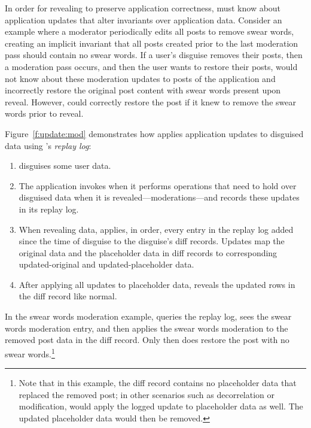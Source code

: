 In order for revealing to preserve application correctness, \sys must know about
application updates that alter invariants over application data.
%
Consider an example where a moderator periodically edits all posts to remove
swear words, creating an implicit invariant that all posts created prior to the
last moderation pass should contain no swear words.
%
If a user's disguise removes their posts, then a moderation pass occurs, and
then the user wants to restore their posts, \sys would not know about these
moderation updates to posts of the application and incorrectly restore the
original post content with swear words present upon reveal.
%
However, \sys could correctly restore the post if it knew to remove the swear
words prior to reveal.
%
%
%

%
Figure~\ref{f:update:mod} demonstrates how \sys applies application updates to
disguised data using \sys's \emph{replay log}:
\begin{enumerate}[nosep]
    \item[(1)] \sys disguises some user data.
    \item[(2)] The application invokes \sys when it
performs operations that need to hold over disguised data when it is
revealed---\eg moderations---and \sys records these updates in its replay log.
    \item[(3)] When revealing data, \sys applies, in order, every entry in the replay log
added since the time of disguise to the disguise's diff records.
Updates map the original data and the placeholder data in diff records
to corresponding updated-original and updated-placeholder data. 
\item[(4)] After applying all updates to placeholder data, \sys reveals the updated rows in
the diff record like normal.
\end{enumerate}
%
%
%
In the swear words moderation example, \sys queries the replay log, sees
the swear words moderation entry, and then applies the swear words moderation to
the removed post data in the diff record. Only then does \sys restore the post
with no swear words.\footnote{Note that in this example, the diff
record contains no placeholder data that replaced the removed post; in other
scenarios such as decorrelation or modification, \sys would apply the logged
update to placeholder data as well. The updated placeholder data would then be
removed.}

